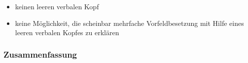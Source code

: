 {{\begin{itemize}
unterschiedliche Verzweigungen:
\eal
\ex {}[[[Gibt er] dem Mann] den Ball]?
\ex {}[Hat [er [dem Mann [den Ball gegeben]]]]?
\zl

\item keinen leeren verbalen Kopf 

\item keine Möglichkeit, die scheinbar mehrfache
Vorfeldbesetzung mit Hilfe eines leeren verbalen Kopfes zu erklären
\end{itemize}

}

\subsubsection{Zusammenfassung}



} %


